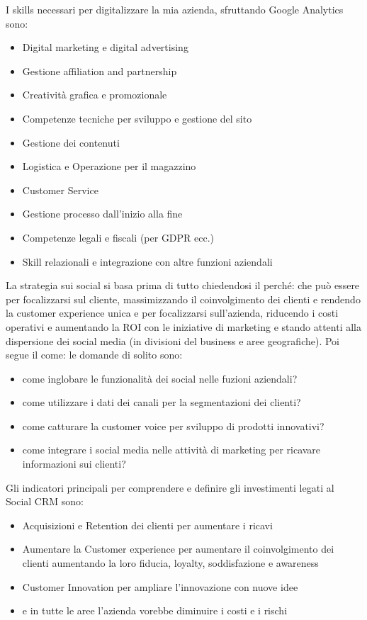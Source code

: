 \documentclass[11pt]{article}
\newenvironment{nosepitemize}{\begin{itemize}[noitemsep,topsep=0ex]}{\end{itemize}}
\begin{document}
I skills necessari per digitalizzare la mia azienda, sfruttando Google Analytics sono:

\begin{nosepitemize}
	\item Digital marketing e digital advertising
	\item Gestione affiliation and partnership
	\item Creatività grafica e promozionale
	\item Competenze tecniche per sviluppo e gestione del sito
	\item Gestione dei contenuti
	\item Logistica e Operazione per il magazzino
	\item Customer Service
	\item Gestione processo dall'inizio alla fine
	\item Competenze legali e fiscali (per GDPR ecc.)
	\item Skill relazionali e integrazione con altre funzioni aziendali
\end{nosepitemize}

La strategia sui social si basa prima di tutto chiedendosi il perché: che può essere per focalizzarsi sul cliente, massimizzando il coinvolgimento dei clienti e rendendo la customer experience unica e per focalizzarsi sull'azienda, riducendo i costi operativi e aumentando la ROI con le iniziative di marketing e stando attenti alla dispersione dei social media (in divisioni del business e aree geografiche).
Poi segue il come: le domande di solito sono:
\begin{nosepitemize}
	\item come inglobare le funzionalità dei social nelle fuzioni aziendali?
	\item come utilizzare i dati dei canali per la segmentazioni dei clienti?
	\item come catturare la customer voice per sviluppo di prodotti innovativi?
	\item come integrare i social media nelle attività di marketing per ricavare informazioni sui clienti?
\end{nosepitemize}

Gli indicatori principali per comprendere e definire gli investimenti legati al Social CRM sono:
\begin{nosepitemize}
	\item Acquisizioni e Retention dei clienti per aumentare i ricavi
	\item Aumentare la Customer experience per aumentare il coinvolgimento dei clienti aumentando la loro fiducia, loyalty, soddisfazione e awareness
	\item Customer Innovation per ampliare l'innovazione con nuove idee
	\item e in tutte le aree l'azienda vorebbe diminuire i costi e i rischi
\end{nosepitemize}
\end{document}
